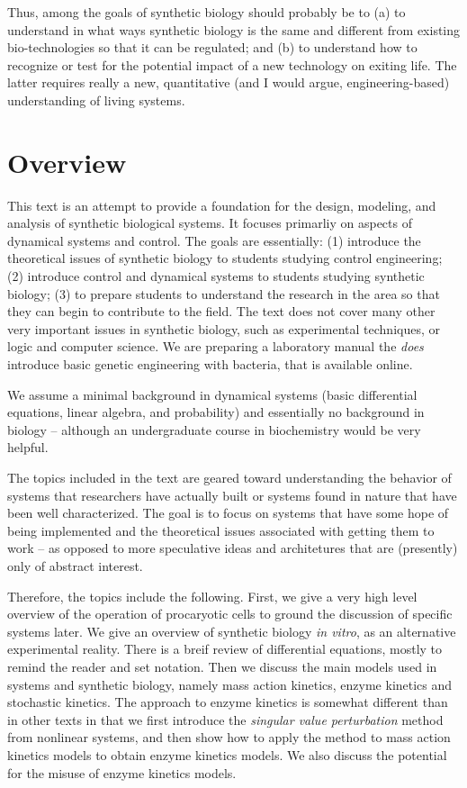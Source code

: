 Thus, among the goals of synthetic biology should probably be to (a)
to understand in what ways synthetic biology is the same and different
from existing bio-technologies so that it can be regulated; and (b) to
understand how to recognize or test for the potential impact of a new
technology on exiting life. The latter requires really a new,
quantitative (and I would argue, engineering-based) understanding of
living systems.

\section{Overview}

This text is an attempt to provide a foundation for the design,
modeling, and analysis of synthetic biological systems. It focuses
primarliy on aspects of dynamical systems and control. The goals are
essentially: (1) introduce the theoretical issues of synthetic biology
to students studying control engineering; (2) introduce control and
dynamical systems to students studying synthetic biology; (3) to
prepare students to understand the research in the area so that they
can begin to contribute to the field. The text does not cover many
other very important issues in synthetic biology, such as experimental
techniques, or logic and computer science. We are preparing a
laboratory manual the {\em does} introduce basic genetic engineering
with bacteria, that is available online.

We assume a minimal background in dynamical systems (basic
differential equations, linear algebra, and probability) and
essentially no background in biology -- although an undergraduate
course in biochemistry would be very helpful. 

The topics included in the text are geared toward understanding the
behavior of systems that researchers have actually built or systems
found in nature that have been well characterized. The goal is to
focus on systems that have some hope of being implemented and the
theoretical issues associated with getting them to work -- as opposed
to more speculative ideas and architetures that are (presently) only
of abstract interest.

Therefore, the topics include the following. First, we give a very
high level overview of the operation of procaryotic cells to ground
the discussion of specific systems later. We give an overview of
synthetic biology {\em in vitro}, as an alternative experimental
reality. There is a breif review of differential equations, mostly to
remind the reader and set notation. Then we discuss the main models
used in systems and synthetic biology, namely mass action kinetics,
enzyme kinetics and stochastic kinetics. The approach to enzyme
kinetics is somewhat different than in other texts in that we first
introduce the {\em singular value perturbation} method from nonlinear
systems, and then show how to apply the method to mass action kinetics
models to obtain enzyme kinetics models. We also discuss the potential
for the misuse of enzyme kinetics models.

